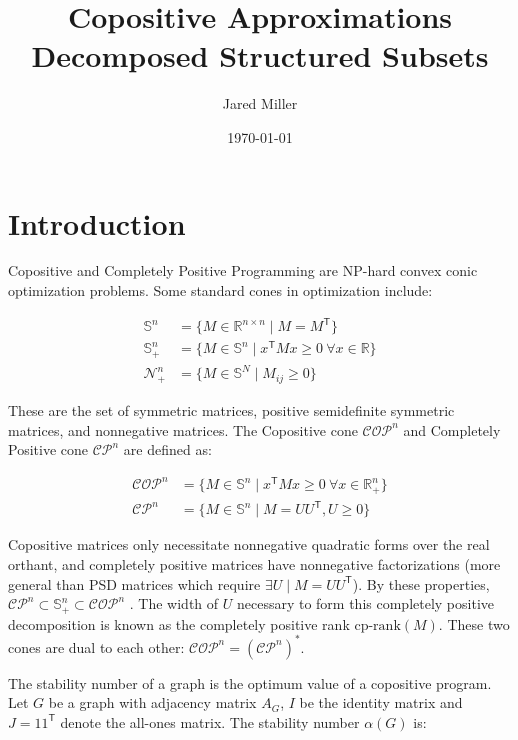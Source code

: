 \documentclass{article}
\title{Copositive Approximations Decomposed Structured Subsets}
\author{Jared Miller}
\date{\today}
\newcommand{\tr}{{\mathsf T}}
\newcommand{\R}{\mathbb{R}}
\newcommand{\psd}{\mathbb{S}}
\newcommand{\N}{\mathcal{N}}
\newcommand{\cp}{\mathcal{C}\mathcal{P}}
\newcommand{\cop}{\mathcal{C}\mathcal{O}\mathcal{P}}
\begin{document}
\maketitle

\section{Introduction}

\maketitle


Copositive and Completely Positive Programming are NP-hard convex conic optimization problems. Some standard cones in optimization include:

\begin{align*}
    \psd^n &= \{M \in \R^{n \times n} \mid M = M^{\tr}\} \\
    \psd_+^n &= \{M \in \psd^n \mid x^{\tr} M x \geq 0 \ \forall x \in \R\} \\
    \N_+^n &= \{M \in \psd^N \mid M_{ij} \geq 0\}
\end{align*}

These are the set of symmetric matrices, positive semidefinite symmetric matrices, and nonnegative matrices. The Copositive cone $\cop^n$ and Completely Positive cone $\cp^n$ are defined as:

\begin{align*}
    \cop^n &= \{M \in \psd^n \mid x^{\tr} M x \geq 0 \ \forall x \in \R^n_+\} \\
    \cp^n &= \{M \in \psd^n \mid M = U U^{\tr}, U \geq 0 \}
\end{align*}

Copositive matrices only necessitate nonnegative quadratic forms over the real orthant, and completely positive matrices have nonnegative factorizations (more general than PSD matrices which require  $\exists U \mid M = U U^{\tr}$). By these properties, $\cp^n \subset \psd_+^n \subset \cop^n$ \cite{berman2003completely}. The width of $U$ necessary to form this completely positive decomposition is known as the completely positive rank $\text{cp-rank}(M)$. These two cones are dual to each other: $\cop^n = (\cp^n)^*$.

The stability number of a graph is the optimum value of a copositive program. Let $G$ be a graph with adjacency matrix $A_G$, $I$ be the identity matrix and $J = 1 1^{\tr}$ denote the all-ones matrix. The stability number $\alpha(G)$ is:
\end{document}

